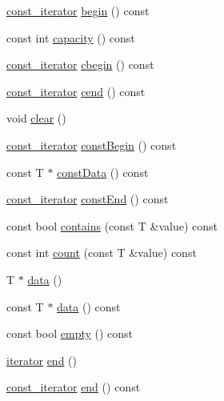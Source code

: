 \begin{DoxyCompactItemize}
\item 
\hyperlink{classprism_1_1_vector_a4ae2d663b42920c426b768119bf9c770}{const\+\_\+iterator} \hyperlink{classprism_1_1_vector_a746cf4e4e8e2fb0a08492cd49184873c}{begin} () const 
\item 
const int \hyperlink{classprism_1_1_vector_aa6bfbb4672a51177c6fafbd503e90a92}{capacity} () const 
\item 
\hyperlink{classprism_1_1_vector_a4ae2d663b42920c426b768119bf9c770}{const\+\_\+iterator} \hyperlink{classprism_1_1_vector_a51c94069390154f500dec700c95115f4}{cbegin} () const 
\item 
\hyperlink{classprism_1_1_vector_a4ae2d663b42920c426b768119bf9c770}{const\+\_\+iterator} \hyperlink{classprism_1_1_vector_aebc4d15b59e500f50bce862a15313475}{cend} () const 
\item 
void \hyperlink{classprism_1_1_vector_acb8a681b958856d257b145930014c6fa}{clear} ()
\item 
\hyperlink{classprism_1_1_vector_a4ae2d663b42920c426b768119bf9c770}{const\+\_\+iterator} \hyperlink{classprism_1_1_vector_a38edad28aad5976c79ce9a29efac482d}{const\+Begin} () const 
\item 
const T $\ast$ \hyperlink{classprism_1_1_vector_af051d250f2917b7e0a63e817321d57cc}{const\+Data} () const 
\item 
\hyperlink{classprism_1_1_vector_a4ae2d663b42920c426b768119bf9c770}{const\+\_\+iterator} \hyperlink{classprism_1_1_vector_a089945b39104d140d7bc49308e81b8f1}{const\+End} () const 
\item 
const bool \hyperlink{classprism_1_1_vector_a6b21bf92cde4f91cb8d14efb4e315ea0}{contains} (const T \&value) const 
\item 
const int \hyperlink{classprism_1_1_vector_ad40e1dc908502680797f37312dda7a4f}{count} (const T \&value) const 
\item 
T $\ast$ \hyperlink{classprism_1_1_vector_a42543c0468946f9d4591a8144b8339e9}{data} ()
\item 
const T $\ast$ \hyperlink{classprism_1_1_vector_aa6fa03a34d9af47e5f3b90a25b2a15a9}{data} () const 
\item 
const bool \hyperlink{classprism_1_1_vector_ad710950cfeaaf977ef629e69fc39b5a7}{empty} () const 
\item 
\hyperlink{classprism_1_1_vector_aec3211503bad8800731cc3e08170592e}{iterator} \hyperlink{classprism_1_1_vector_ab99fc2adbb9fb098c00de3764cae8fb7}{end} ()
\item 
\hyperlink{classprism_1_1_vector_a4ae2d663b42920c426b768119bf9c770}{const\+\_\+iterator} \hyperlink{classprism_1_1_vector_a1a98efdc5a16afaa231187dd38678415}{end} () const 

\end{DoxyCompactItemize}
